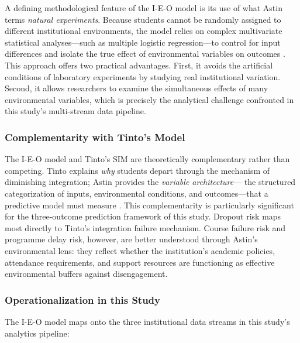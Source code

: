 \documentclass[12pt]{report}
\begin{document}
A defining methodological feature of the I-E-O model is its use of what
Astin terms \textit{natural experiments}. Because students cannot be randomly
assigned to different institutional environments, the model relies on complex
multivariate statistical analyses---such as multiple logistic regression---to
control for input differences and isolate the true effect of environmental
variables on outcomes \parencite{astin2012}. This approach offers two
practical advantages. First, it avoids the artificial conditions of laboratory
experiments by studying real institutional variation. Second, it allows
researchers to examine the simultaneous effects of many environmental
variables, which is precisely the analytical challenge confronted in this
study's multi-stream data pipeline.

\subsubsection{Complementarity with Tinto's Model}

The I-E-O model and Tinto's SIM are theoretically complementary rather than
competing. Tinto explains \textit{why} students depart through the mechanism
of diminishing integration; Astin provides the \textit{variable architecture}---
the structured categorization of inputs, environmental conditions, and
outcomes---that a predictive model must measure \parencite{Nicoletti2019,
bentojunior2025}. This complementarity is particularly significant for the
three-outcome prediction framework of this study. Dropout risk maps most
directly to Tinto's integration failure mechanism. Course failure risk and
programme delay risk, however, are better understood through Astin's
environmental lens: they reflect whether the institution's academic policies,
attendance requirements, and support resources are functioning as effective
environmental buffers against disengagement.

\subsubsection{Operationalization in this Study}

The I-E-O model maps onto the three institutional data streams in this
study's analytics pipeline:
\end{document}

